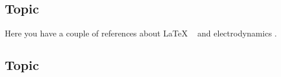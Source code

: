\subsection{Topic}

Here you have a couple of references about LaTeX ~\cite{latexcompanion} and electrodynamics \cite{einstein}.

\bigskip

\subsection{Topic}
